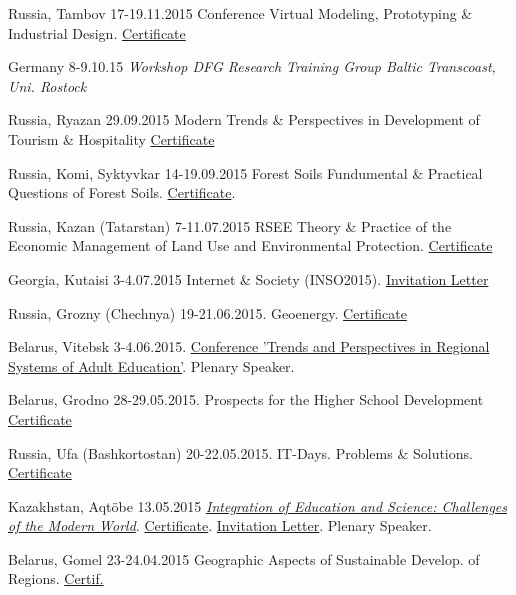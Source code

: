 \documentclass[10pt]{article}
\begin{document}
\begin{etaremune}
	\item	 Russia, Tambov 17-19.11.2015  Conference Virtual Modeling, Prototyping \& Industrial Design. \href{https://drive.google.com/open?id=1d0ijaq5tmPIw48Ma_Sb6EPgbEYF026FZ}{Certificate}
	\item Germany  8-9.10.15 \emph{Workshop DFG Research Training Group Baltic Transcoast, Uni. Rostock} 				
	\item	Russia, Ryazan 29.09.2015 Modern Trends \& Perspectives in Development of Tourism \& Hospitality \href{https://drive.google.com/open?id=1_Fb8oftTRlwbtY5fNpQQCcHTt2QB0-ms}{Certificate} 			
	\item	Russia, Komi, Syktyvkar 14-19.09.2015  Forest Soils Fundumental \& Practical Questions of Forest Soils. \href{https://drive.google.com/open?id=1Hbban7h80uYvQqQmvn3fZI_9v9dhkn_F}{Certificate}. 	
	\item	 Russia, Kazan (Tatarstan) 7-11.07.2015  RSEE Theory \& Practice of the Economic Management of Land Use and Environmental Protection. \href{https://drive.google.com/open?id=1aaiHDa4YTEGarJK400cDoLA7VS92n9pj}{Certificate} 
	\item	Georgia, Kutaisi 3-4.07.2015  Internet \& Society (INSO2015). \href{https://drive.google.com/open?id=1Nu2VPmWyTtNxJsUcSHBoASXjGWw4-DHL}{Invitation Letter} 						
	\item	Russia, Grozny (Chechnya) 19-21.06.2015. Geoenergy. \href{https://drive.google.com/open?id=1cQ-Azw7_42aGD-8XSRH6EgYOwIoQiVI-}{Certificate} 						
	\item	Belarus, Vitebsk 3-4.06.2015. \href{http://conference.vstu.by/}{Conference 'Trends and Perspectives in Regional Systems of Adult Education'}. Plenary Speaker.			
	\item	Belarus, Grodno 28-29.05.2015. Prospects for the Higher School Development \href{https://drive.google.com/open?id=1lEGm8YZTiz3TBunBndk1QtIQft32K0au}{Certificate} 					
	\item	Russia, Ufa (Bashkortostan) 20-22.05.2015.  IT-Days. Problems \& Solutions. \href{https://drive.google.com/open?id=1K7bFgsGKMVQ7jyYOg6bA82IyXbsTx_ZO}{Certificate} 					
	\item	Kazakhstan, Aqt\"{o}be 13.05.2015 \href{http://krmu.kz/en/}{\emph{Integration of Education and Science: Challenges of the Modern World}}. \href{https://drive.google.com/open?id=1NxuiGyvuYseBmsPUSfrCwyrgo4WQYG9u}{Certificate}. \href{https://drive.google.com/open?id=11rtqEFLuKOn9M_J_k0Gykv3IY_GBqxFC}{Invitation Letter}. Plenary Speaker.					
	\item	Belarus, Gomel 23-24.04.2015 Geographic Aspects of Sustainable Develop. of Regions. \href{https://drive.google.com/open?id=1KB9rrG8zxeyfXQC04vTdpQYkBoXwwHnI}{Certif.}					

\end{etaremune}
\end{document}
